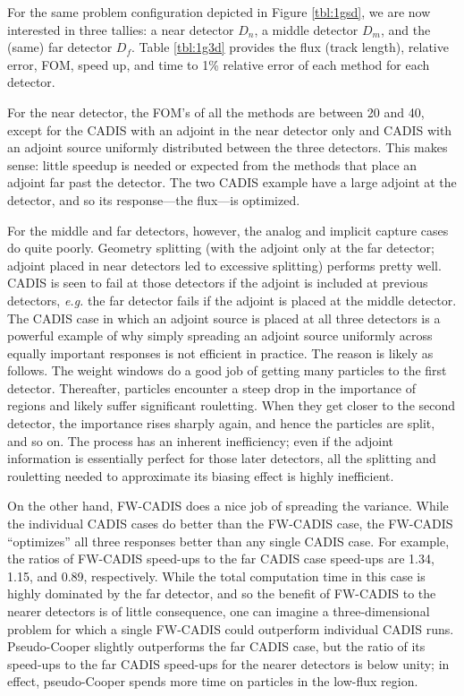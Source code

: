 \documentclass[letter,11pt]{article}
\newcommand{\eg}{{\it e.g. }}
\begin{document}
For the same problem configuration depicted in Figure \ref{tbl:1gsd}, we are now interested in three tallies: a near detector $D_n$, a middle detector $D_m$, and the (same) far detector $D_f$.  Table \ref{tbl:1g3d} provides the flux (track length), relative error, FOM, speed up, and time to 1\% relative error of each method for each detector.

For the near detector, the FOM's of all the methods are between 20 and 40, except for the CADIS with an adjoint in the near detector only and CADIS with an adjoint source uniformly distributed between the three detectors.  This makes sense: little speedup is needed or expected from the methods that place an adjoint far past the detector.  The two CADIS example have a large adjoint at the detector, and so its response---the flux---is optimized.

For the middle and far detectors, however, the analog and implicit capture cases do quite poorly.   Geometry splitting (with the adjoint only at the far detector; adjoint placed in near detectors led to excessive splitting) performs pretty well.  CADIS is seen to fail at those detectors if the adjoint is included at previous detectors, \eg the far detector fails if the adjoint is placed at the middle detector.  The CADIS case in which an adjoint source is placed at all three detectors is a powerful example of why simply spreading an adjoint source uniformly across equally important responses is not efficient in practice.  The reason is likely as follows.  The weight windows do a good job of getting many particles to the first detector.  Thereafter, particles encounter a steep drop in the importance of regions and likely suffer significant rouletting.  When they get closer to the second detector, the importance rises sharply again, and hence the particles are split, and so on.  The process has an inherent inefficiency; even if the adjoint information is essentially perfect for those later detectors, all the splitting and rouletting needed to approximate its biasing effect is highly inefficient.  

On the other hand, FW-CADIS does a nice job of spreading the variance.  While the individual CADIS cases do better than the FW-CADIS case, the FW-CADIS ``optimizes'' all three responses better than any single CADIS case.  For example, the ratios of FW-CADIS speed-ups to the far CADIS case speed-ups are 1.34, 1.15, and 0.89, respectively.  While the total computation time in this case is highly dominated by the far detector, and so the benefit of FW-CADIS to the nearer detectors is of little consequence, one can imagine a three-dimensional problem for which a single FW-CADIS could outperform individual CADIS runs.  Pseudo-Cooper slightly outperforms the far CADIS case, but the ratio of its speed-ups to the far CADIS speed-ups for the nearer detectors is below unity; in effect, pseudo-Cooper spends more time on particles in the low-flux region.
\end{document}

